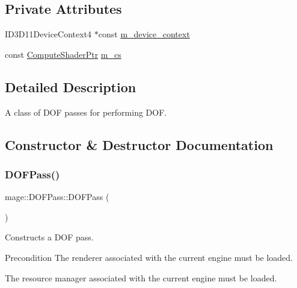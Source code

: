 \subsection*{Private Attributes}
\begin{DoxyCompactItemize}
\item 
I\+D3\+D11\+Device\+Context4 $\ast$const \hyperlink{classmage_1_1_d_o_f_pass_a4f0255efe5c79a597462c1535675290e}{m\+\_\+device\+\_\+context}
\item 
const \hyperlink{namespacemage_a95ee75d4d07106395d80f751d364dc1b}{Compute\+Shader\+Ptr} \hyperlink{classmage_1_1_d_o_f_pass_a409baa8803ef547b52ccf28233aca117}{m\+\_\+cs}
\end{DoxyCompactItemize}


\subsection{Detailed Description}
A class of D\+OF passes for performing D\+OF. 

\subsection{Constructor \& Destructor Documentation}
\hypertarget{classmage_1_1_d_o_f_pass_a11dccae5f2613da112845158f69727e7}{}\label{classmage_1_1_d_o_f_pass_a11dccae5f2613da112845158f69727e7} 
\subsubsection{\texorpdfstring{D\+O\+F\+Pass()}{DOFPass()}\hspace{0.1cm}{\footnotesize\ttfamily [1/3]}}
{\footnotesize\ttfamily mage\+::\+D\+O\+F\+Pass\+::\+D\+O\+F\+Pass (\begin{DoxyParamCaption}{ }\end{DoxyParamCaption})}

Constructs a D\+OF pass.

\begin{DoxyPrecond}{Precondition}
The renderer associated with the current engine must be loaded. 

The resource manager associated with the current engine must be loaded. 
\end{DoxyPrecond}
\hypertarget{classmage_1_1_d_o_f_pass_a5e8715db10b77bd090e3be9c8df7a0b5}{}\label{classmage_1_1_d_o_f_pass_a5e8715db10b77bd090e3be9c8df7a0b5} 
